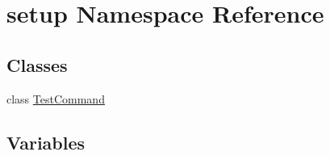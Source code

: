 \hypertarget{namespacesetup}{}\section{setup Namespace Reference}
\label{namespacesetup}
\subsection*{Classes}
\begin{DoxyCompactItemize}
\item 
class \hyperlink{classsetup_1_1_test_command}{Test\+Command}
\end{DoxyCompactItemize}
\subsection*{Variables}
